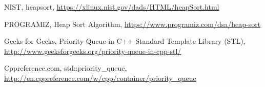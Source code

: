 \begin{thebibliography}{9}
NIST, heapsort, \href{https://xlinux.nist.gov/dads/HTML/heapSort.html}{https://xlinux.nist.gov/dads/HTML/heapSort.html}

PROGRAMIZ, Heap Sort Algorithm, \href{https://www.programiz.com/dsa/heap-sort}{https://www.programiz.com/dsa/heap-sort}

Geeks for Geeks, Priority Queue in C++ Standard Template Library (STL), \href{http://www.geeksforgeeks.org/priority-queue-in-cpp-stl/}{http://www.geeksforgeeks.org/priority-queue-in-cpp-stl/}

Cppreference.com, std::priority\_queue, \href{http://en.cppreference.com/w/cpp/container/priority_queue}{http://en.cppreference.com/w/cpp/container/priority\_queue}

\end{thebibliography}

